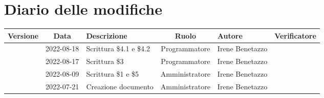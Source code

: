 \section*{Diario delle modifiche}
	\begin{center}
	\renewcommand{\arraystretch}{1.8} %
	\begin{longtable}{ |c|c|p{8em}|c|m{5em}|m{6em}| }
	\hline
	\textbf{Versione} & \textbf{Data} & \textbf{Descrizione} &  \textbf{Ruolo} &  \textbf{Autore} & \textbf{Verificatore}\\ %
	\hline %
	& 2022-08-18 & Scrittura \$4.1 e \$4.2 & Programmatore & Irene \newline Benetazzo & \\ 
	\hline
	& 2022-08-17 & Scrittura \$3 & Programmatore & Irene \newline Benetazzo & \\ 
	\hline
	& 2022-08-09 & Scrittura \$1 e \$5 & Amministratore & Irene \newline Benetazzo & \\ 
	\hline
    & 2022-07-21 & Creazione documento & Amministratore & Irene \newline Benetazzo & \\ 
	\hline
	\end{longtable}
	\end{center}
	\newpage